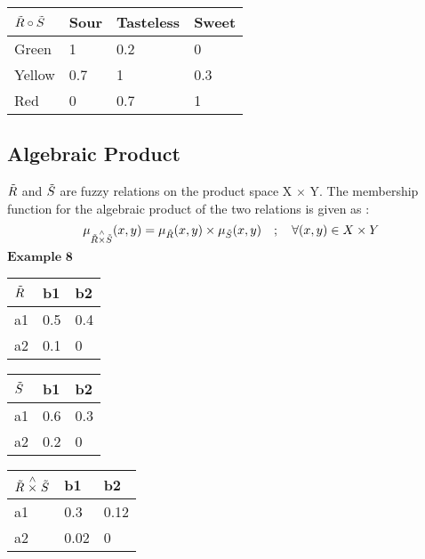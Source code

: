 \documentclass{article}
\begin{document}
\begin{center}
    \def\arraystretch{1.4}%
\begin{tabular}{ | m{1cm} | m{1cm}| m{1.4cm} | m{1cm}| } 
  \hline
  $\Tilde{R}\circ\Tilde{S}$ & Sour & Tasteless & Sweet \\ 
  \hline
  Green & 1 & 0.2 & 0 \\ 
  \hline
  Yellow & 0.7 & 1 & 0.3\\ 
  \hline
  Red & 0 & 0.7 & 1 \\ 
  \hline
\end{tabular}
\end{center}
\subsection{Algebraic Product}
$\Tilde{R}$ and $\Tilde{S}$ are fuzzy relations on the product space X $\times$ Y. The membership function for the algebraic product of the two relations is given as :
\[\mu_{\Tilde{R}\stackrel{\wedge}{\times}\Tilde{S}}(x,y)=\mu_{\Tilde{R}}(x,y)\times\mu_{\Tilde{S}}(x,y)\quad;\quad \forall (x,y)\in X\times Y\]
$\textbf{Example 8}$\newline
\begin{center}
\def\arraystretch{1.4}%
\begin{tabular}{ | m{1cm} | m{1cm}| m{1cm} | } 
  \hline
  $\Tilde{R}$& b1 & b2 \\ 
  \hline
  a1  & 0.5 & 0.4 \\ 
  \hline
  a2 & 0.1 & 0 \\ 
  \hline
\end{tabular}
\quad
\def\arraystretch{1.4}%
\begin{tabular}{ | m{1cm} | m{1cm}| m{1cm} | } 
  \hline
  $\Tilde{S}$& b1 & b2 \\ 
  \hline
  a1  & 0.6 & 0.3 \\ 
  \hline
  a2 & 0.2 & 0 \\ 
  \hline
\end{tabular}
\end{center}
\begin{center}
\def\arraystretch{1.4}%
\begin{tabular}{ | m{1cm} | m{1cm}| m{1cm} | } 
  \hline
  $\Tilde{R}\stackrel{\wedge}{\times}\Tilde{S}$& b1 & b2 \\ 
  \hline
  a1  & 0.3 & 0.12 \\ 
  \hline
  a2 & 0.02 & 0 \\ 
  \hline
\end{tabular}
\end{center}
\end{document}
